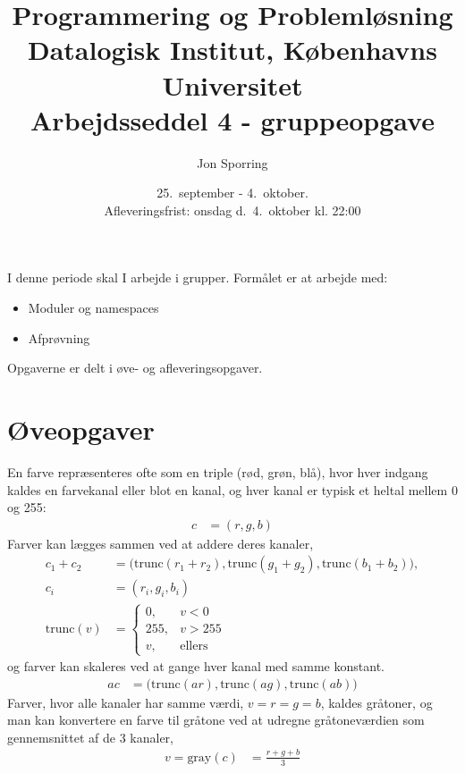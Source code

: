 \documentclass[a4paper,12pt]{article}
\title{Programmering og Problemløsning\\Datalogisk Institut,
  Københavns Universitet\\Arbejdsseddel 4 - gruppeopgave}
\author{Jon Sporring}
\date{25.\ september - 4.\ oktober.\\Afleveringsfrist: onsdag d.\ 4.\ oktober kl. 22:00}
\begin{document}
\maketitle

I denne periode skal I arbejde i grupper. Formålet er at arbejde med:
\begin{itemize}
\item Moduler og namespaces
\item Afprøvning
\end{itemize}
 
Opgaverne er delt i øve- og afleveringsopgaver. 

\section*{Øveopgaver}
En farve repræsenteres ofte som en triple (rød, grøn, blå), hvor hver indgang kaldes en farvekanal eller blot en kanal, og hver kanal er typisk et heltal mellem 0 og 255:
\begin{align}
  c &= (r, g,b)
\end{align}
Farver kan lægges sammen ved at addere deres kanaler,
\begin{align}
  c_1 + c_2 &= \big(\text{trunc}(r_1+r_2), \text{trunc}(g_1+g_2), \text{trunc}(b_1+b_2)\big),
  \\c_i &= (r_i, g_i,b_i)
  \\\text{trunc}(v) &=
  \begin{cases}
    0, &v < 0
    \\255, &v > 255
    \\v, &\text{ellers}
  \end{cases}
\end{align}
og farver kan skaleres ved at gange hver kanal med samme konstant.
\begin{align}
  a c &= \big(\text{trunc}(a r), \text{trunc}(a g), \text{trunc}(a b)\big)
\end{align}
Farver, hvor alle kanaler har samme værdi, $v=r=g=b$, kaldes gråtoner, og man kan konvertere en farve til gråtone ved at udregne gråtoneværdien som gennemsnittet af de 3 kanaler,
\begin{align}
  v = \text{gray}(c) &= \frac{r+g+b}{3}
\end{align}
\end{document}
